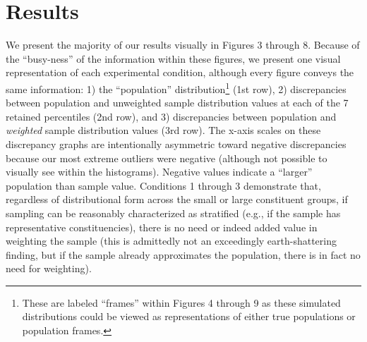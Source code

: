 \documentclass[
  ,man]{apa6}
\begin{document}
\hypertarget{results}{%
\section{Results}\label{results}}

We present the majority of our results visually in Figures 3 through 8. Because of the ``busy-ness'' of the information within these figures, we present one visual representation of each experimental condition, although every figure conveys the same information: 1) the ``population'' distribution\footnote{These are labeled ``frames'' within Figures 4 through 9 as these simulated distributions could be viewed as representations of either true populations or population frames.} (1st row), 2) discrepancies between population and unweighted sample distribution values at each of the 7 retained percentiles (2nd row), and 3) discrepancies between population and \emph{weighted} sample distribution values (3rd row). The x-axis scales on these discrepancy graphs are intentionally asymmetric toward negative discrepancies because our most extreme outliers were negative (although not possible to visually see within the histograms). Negative values indicate a ``larger'' population than sample value. Conditions 1 through 3 demonstrate that, regardless of distributional form across the small or large constituent groups, if sampling can be reasonably characterized as stratified (e.g., if the sample has representative constituencies), there is no need or indeed added value in weighting the sample (this is admittedly not an exceedingly earth-shattering finding, but if the sample already approximates the population, there is in fact no need for weighting).
\end{document}
